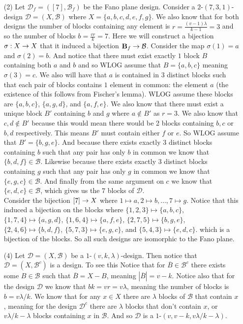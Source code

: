 \documentclass[12pt]{amsart}
\begin{document}
\begin{itemize}
\item[(2)] %
Let $\mathcal{D}_f=([7], \mathcal{B}_f)$ be the Fano plane design. Consider a $2$-$(7,3,1)$-design $\mathcal{D}=(X,\mathcal{B})$ where $X=\{a,b,c,d,e,f,g\}$. We also know that for both designs the number of blocks containing any element is $r=\frac{(v-1)\lambda}{k-1}=3$ and so the number of blocks $b=\frac{vr}{k}=7$. Here we will construct a bijection $\sigma:X\rightarrow X$ that it induced a bijection $\mathbf{B}_f\rightarrow \mathcal{B}$. Consider the map $\sigma(1)=a$ and $\sigma(2)=b$. And notice that there must exist exactly $1$ block $B$ containing both $a$ and $b$ and so WLOG assume that $B=\{a,b,c\}$ meaning $\sigma(3)=c$. We also will have that $a$ is contained in $3$ distinct blocks such that each pair of blocks contains $1$ element in common: the element $a$ (the existence of this follows from Fischer's lemma). WLOG assume these blocks are $\{a,b,c\}$, $\{a,g,d\}$, and $\{a,f,e\}$. We also know that there must exist a unique block $B'$ containing $b$ and $g$ where $a\not\in B'$ as $r=3$. We also know that $c,d\not\in B'$ because this would mean there would be 2 blocks containing $b,c$ or $b,d$ respectively. This means $B'$ must contain either $f$ or $e$. So WLOG assume that $B'=\{b,g,e\}$. And because there exists exactly $3$ distinct blocks containing $b$ such that any pair has only $b$ in common we know that $\{b,d,f\}\in\mathcal{B}$. Likewise because there exists exactly $3$ distinct blocks containing $g$ such that any pair has only $g$ in common we know that $\{e,g,c\}\in\mathcal{B}$. And finally from the same argument on $c$ we know that $\{e,d,c\}\in \mathcal{B}$, which gives us the $7$ blocks of $\mathcal{D}$.\\

Consider the bijection $[7]\rightarrow X$ where $1\mapsto a,2\mapsto b,\dots, 7\mapsto g$. Notice that this induced a bijection on the blocks where $\{1,2,3\}\mapsto \{a,b,c\}$, $\{1,7,4\}\mapsto \{a,g,d\}$, $\{1,6,4\}\mapsto \{a,f,e\}$, $\{2,7,5\}\mapsto \{b,g,e\}$, $\{2,4,6\}\mapsto \{b,d,f\}$, $\{5,7,3\}\mapsto \{e,g,c\}$, and $\{5,4,3\}\mapsto \{e,d,c\}$. which is a bijection of the blocks. So all such designs are isomorphic to the Fano plane.\\

\item[(4)] %
Let $\mathcal{D}=(X,\mathcal{B})$ be a $1$-$(v,k,\lambda)$-design. Then notice that $\mathcal{D}=(X,\mathcal{B}^c)$ is a design. To see this Notice that for $\overline{B}\in \mathcal{B}^c$ there exists some $B\in\mathcal{B}$ such that $\overline{B}=X-B$, meaning $|\overline{B}|=v-k$. 
Notice also that for the design $\mathcal{D}$ we know that $bk=vr=v\lambda$, meaning the number of blocks is $b=v\lambda/k$. We know that for any $x\in X$ there are $\lambda$ blocks of $\mathcal{B}$ that contain $x$, meaning for the design $\mathcal{D}^c$ there are $\lambda$ blocks that don't contain $x$, or $v\lambda/k-\lambda$ blocks containing $x$ in $\mathcal{B}$. And so $\mathcal{D}$ is a $1$-$(v,v-k,v\lambda/k-\lambda)$.\\


\end{itemize}
\end{document}
